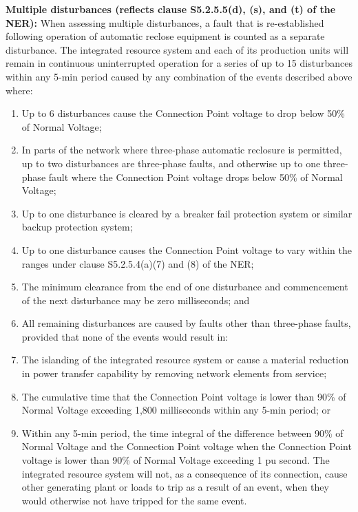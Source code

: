 \textbf{Multiple disturbances (reflects clause S5.2.5.5(d), (s), and (t) of the NER):}  
When assessing multiple disturbances, a fault that is re-established following operation of automatic reclose equipment is counted as a separate disturbance.  
The integrated resource system and each of its production units will remain in continuous uninterrupted operation for a series of up to 15 disturbances within any 5-min period caused by any combination of the events described above where:
\begin{enumerate}
	\item Up to 6 disturbances cause the Connection Point voltage to drop below 50\% of Normal Voltage; 
	\item In parts of the network where three-phase automatic reclosure is permitted, up to two disturbances are three-phase faults, and otherwise up to one three-phase fault where the Connection Point voltage drops below 50\% of Normal Voltage; 
	\item Up to one disturbance is cleared by a breaker fail protection system or similar backup protection system; 
	\item Up to one disturbance causes the Connection Point voltage to vary within the ranges under clause S5.2.5.4(a)(7) and (8) of the NER; 
	\item The minimum clearance from the end of one disturbance and commencement of the next disturbance may be zero milliseconds; and 
	\item All remaining disturbances are caused by faults other than three-phase faults, provided that none of the events would result in:
	\item The islanding of the integrated resource system or cause a material reduction in power transfer capability by removing network elements from service; 
	\item The cumulative time that the Connection Point voltage is lower than 90\% of Normal Voltage exceeding 1,800 milliseconds within any 5-min period; or 
	\item Within any 5-min period, the time integral of the difference between 90\% of Normal Voltage and the Connection Point voltage when the Connection Point voltage is lower than 90\% of Normal Voltage exceeding 1 pu second.
The integrated resource system will not, as a consequence of its connection, cause other generating plant or loads to trip as a result of an event, when they would otherwise not have tripped for the same event.
\end{enumerate}


